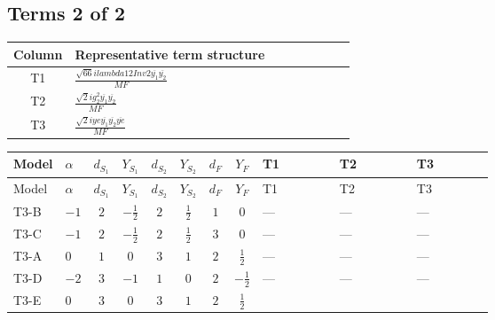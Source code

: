 \documentclass[8pt]{article}
\begin{document}
\begin{landscape}
\subsection*{Terms 2 of 2}
\begin{center}
\begin{tabular}{@{}c >{\raggedright\arraybackslash}p{0.82\linewidth}@{}}
\toprule
Column & Representative term structure \\
\midrule
T1 & \(\displaystyle \frac{\sqrt{66} i lambda12Inv2 \overline{y_{1}} \overline{y_{2}}}{MF}\) \\
\midrule
T2 & \(\displaystyle \frac{\sqrt{2} i g_{2}^{2} \overline{y_{1}} \overline{y_{2}}}{MF}\) \\
\midrule
T3 & \(\displaystyle \frac{\sqrt{2} i ye \overline{y_{1}} \overline{y_{2}} \overline{ye}}{MF}\) \\
\midrule
\bottomrule
\end{tabular}
\end{center}
\smallskip
\tiny
\begin{longtable}{@{}llcccccc >{\raggedright\arraybackslash}p{0.21\linewidth} >{\raggedright\arraybackslash}p{0.21\linewidth} >{\raggedright\arraybackslash}p{0.21\linewidth}@{}}
\toprule
Model & $\alpha$ & $d_{S_1}$ & $Y_{S_1}$ & $d_{S_2}$ & $Y_{S_2}$ & $d_F$ & $Y_F$ & T1 & T2 & T3 \\
\midrule
\endfirsthead
\toprule
Model & $\alpha$ & $d_{S_1}$ & $Y_{S_1}$ & $d_{S_2}$ & $Y_{S_2}$ & $d_F$ & $Y_F$ & T1 & T2 & T3 \\
\midrule
\endhead
T3-B & $-1$ & $2$ & $-\frac{1}{2}$ & $2$ & $\frac{1}{2}$ & $1$ & $0$ & --- & --- & --- \\
\midrule
T3-C & $-1$ & $2$ & $-\frac{1}{2}$ & $2$ & $\frac{1}{2}$ & $3$ & $0$ & --- & --- & --- \\
\midrule
T3-A & $0$ & $1$ & $0$ & $3$ & $1$ & $2$ & $\frac{1}{2}$ & --- & --- & --- \\
\midrule
T3-D & $-2$ & $3$ & $-1$ & $1$ & $0$ & $2$ & $-\frac{1}{2}$ & --- & --- & --- \\
\midrule
T3-E & $0$ & $3$ & $0$ & $3$ & $1$ & $2$ & $\frac{1}{2}$ & \scriptsize\adjustbox{max width=\linewidth}{$\begin{gathered} \frac{3 \sqrt{66} i lambda12Inv2 \overline{y_{1}} \overline{y_{2}}}{44 MF}\end{gathered}$} & \scriptsize\adjustbox{max width=\linewidth}{$\begin{gathered} \frac{33 \sqrt{2} i g_{2}^{2} \overline{y_{1}} \overline{y_{2}}}{16 MF}\end{gathered}$} & \scriptsize\adjustbox{max width=\linewidth}{$\begin{gathered} - \frac{\sqrt{2} i ye \overline{y_{1}} \overline{y_{2}} \overline{ye}}{8 MF}\end{gathered}$} \\
\midrule
\bottomrule
\end{longtable}
\end{landscape}
\end{document}
